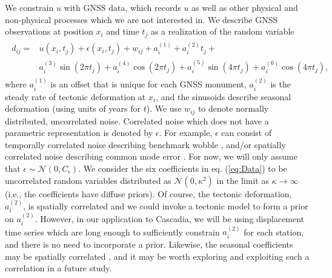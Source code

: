 \documentclass[10pt,a4paper]{article}
\begin{document}
We constrain $u$ with GNSS data, which records $u$ as well as other physical and non-physical processes which we are not interested in. We describe GNSS observations at position $x_i$ and time $t_j$ as a realization of the random variable 
\begin{align}\label{eq:Data}
\begin{split}
d_{ij} = &u(x_i,t_j) + \epsilon(x_i,t_j) + w_{ij} + a^{(1)}_i + a^{(2)}_it_j + \\
         &a^{(3)}_i\sin(2 \pi t_j) + a^{(4)}_i\cos(2 \pi t_j) + a^{(5)}_i\sin(4 \pi t_j) + a^{(6)}_i\cos(4 \pi t_j), 
\end{split}
\end{align}
where $a^{(1)}_{i}$ is an offset that is unique for each GNSS monument, $a^{(2)}_{i}$ is the steady rate of tectonic deformation at $x_i$, and the sinusoids describe seasonal deformation (using units of years for $t$). We use $w_{ij}$ to denote normally distributed, uncorrelated noise. Correlated noise which does not have a parametric representation is denoted by $\epsilon$.  For example, $\epsilon$ can consist of temporally correlated noise describing benchmark wobble \citep[e.g.,][]{Wyatt1982,Wyatt1989}, and/or spatially correlated noise describing common mode error \citep[e.g.,][]{Wdowinski1997}. For now, we will only assume that $\epsilon \sim \mathcal{N}(0,C_\epsilon)$. We consider the six coefficients in eq. (\ref{eq:Data}) to be uncorrelated random variables distributed as $\mathcal{N}(0,\kappa^2)$ in the limit as $\kappa \to \infty$ (i.e., the coefficients have diffuse priors). Of course, the tectonic deformation, $a^{(2)}_{i}$, is spatially correlated and we could invoke a tectonic model to form a prior on $a^{(2)}_{i}$. However, in our application to Cascadia, we will be using displacement time series which are long enough to sufficiently constrain $a^{(2)}_{i}$ for each station, and there is no need to incorporate a prior. Likewise, the seasonal coefficients may be spatially correlated \citep{Langbein2008}, and it may be worth exploring and exploiting such a correlation in a future study. 
\end{document}
